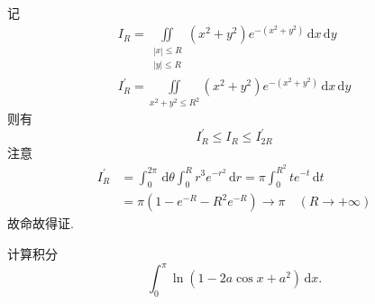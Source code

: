 	\begin{solution}
		记
		$$\begin{array}{l}
			I_{R}=\iint\limits_{\substack{|x| \leqslant R \\
					|y| \leqslant R}}\left(x^{2}+y^{2}\right) e^{-\left(x^{2}+y^{2}\right)} \,\text{d} x \,\text{d} y \\
			I_{R}^{\prime}=\iint\limits_{x^{2}+y^{2} \leqslant R^{2}}\left(x^{2}+y^{2}\right) e^{-\left(x^{2}+y^{2}\right)} \,\text{d} x \,\text{d} y
		\end{array}$$
		则有
		$$I_{R}^{\prime} \leqslant I_{R} \leqslant I_{2 R}^{\prime}$$
		注意
		$$\begin{aligned}
			I_{R}^{\prime} &=\int_{0}^{2 \pi} \,\text{d} \theta \int_{0}^{R} r^{3} e^{-r^{2}} \,\text{d} r=\pi \int_{0}^{R^{2}} t e^{-t} \,\text{d} t \\
			&=\pi\left(1-e^{-R}-R^{2} e^{-R}\right) \rightarrow \pi \quad(R \rightarrow+\infty)
		\end{aligned}$$
		故命故得证. 
	\end{solution}
	\newpage
	\begin{problem}
		计算积分  $$\int_{0}^{\pi} \ln \left(1-2 a \cos x+a^{2}\right)\,\text{d}x .$$
	\end{problem}
	

